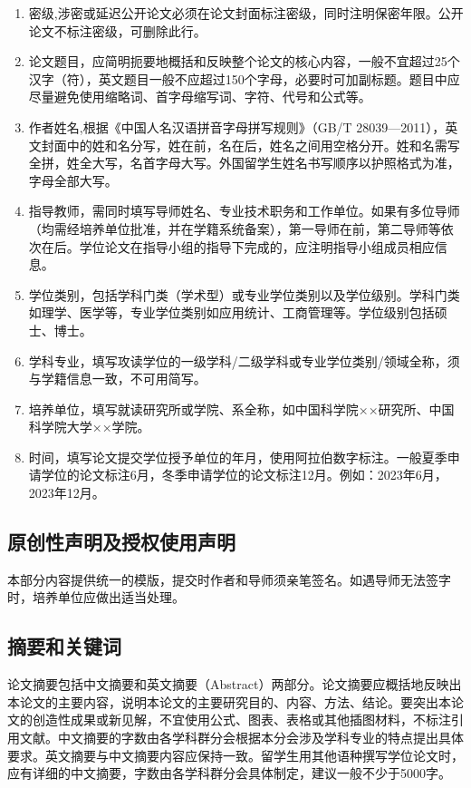 {\begin{enumerate}
    \item 密级,涉密或延迟公开论文必须在论文封面标注密级，同时注明保密年限。公开论文不标注密级，可删除此行。
    \item 论文题目，应简明扼要地概括和反映整个论文的核心内容，一般不宜超过25个汉字（符），英文题目一般不应超过150个字母，必要时可加副标题。题目中应尽量避免使用缩略词、首字母缩写词、字符、代号和公式等。
    \item 作者姓名,根据《中国人名汉语拼音字母拼写规则》（GB/T 28039—2011），英文封面中的姓和名分写，姓在前，名在后，姓名之间用空格分开。姓和名需写全拼，姓全大写，名首字母大写。外国留学生姓名书写顺序以护照格式为准，字母全部大写。
    \item 指导教师，需同时填写导师姓名、专业技术职务和工作单位。如果有多位导师（均需经培养单位批准，并在学籍系统备案），第一导师在前，第二导师等依次在后。学位论文在指导小组的指导下完成的，应注明指导小组成员相应信息。
    \item 学位类别，包括学科门类（学术型）或专业学位类别以及学位级别。学科门类如理学、医学等，专业学位类别如应用统计、工商管理等。学位级别包括硕士、博士。
    \item 学科专业，填写攻读学位的一级学科/二级学科或专业学位类别/领域全称，须与学籍信息一致，不可用简写。
    \item 培养单位，填写就读研究所或学院、系全称，如中国科学院××研究所、中国科学院大学××学院。
    \item 时间，填写论文提交学位授予单位的年月，使用阿拉伯数字标注。一般夏季申请学位的论文标注6月，冬季申请学位的论文标注12月。例如：2023年6月，2023年12月。
\end{enumerate}

\subsection{原创性声明及授权使用声明}
本部分内容提供统一的模版，提交时作者和导师须亲笔签名。如遇导师无法签字时，培养单位应做出适当处理。
\subsection{摘要和关键词}
论文摘要包括中文摘要和英文摘要（Abstract）两部分。论文摘要应概括地反映出本论文的主要内容，说明本论文的主要研究目的、内容、方法、结论。要突出本论文的创造性成果或新见解，不宜使用公式、图表、表格或其他插图材料，不标注引用文献。中文摘要的字数由各学科群分会根据本分会涉及学科专业的特点提出具体要求。英文摘要与中文摘要内容应保持一致。留学生用其他语种撰写学位论文时，应有详细的中文摘要，字数由各学科群分会具体制定，建议一般不少于5000字。

}
